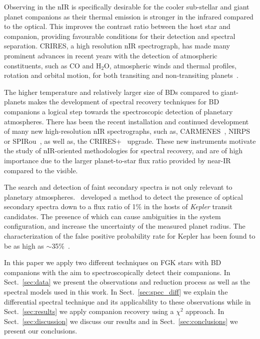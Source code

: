 Observing in the nIR is specifically desirable for the cooler sub-stellar and giant planet companions as their thermal emission is stronger in the infrared compared to the optical. This improves the contrast ratio between the host star and companion, providing favourable conditions for their detection and spectral separation. CRIRES, a high resolution nIR spectrograph, has made many prominent advances in recent years with the detection of atmospheric constituents, such as \(\textrm{CO} \) and \(\textrm{H}_{2}\textrm{O} \), atmospheric winds and thermal profiles, rotation and orbital motion, for both transiting and non-transiting planets~\citep[e.g.][]{snellen_orbital_2010, brogi_signature_2012, rodler_weighing_2012, dekok_detection_2013, brogi_carbon_2014, snellen_fast_2014, piskorz_evidence_2016, brogi_rotation_2016, birkby_discovery_2017}.

The higher temperature and relatively larger size of BDs compared to giant-planets makes the development of spectral recovery techniques for BD companions a logical step towards the spectroscopic detection of planetary atmospheres. There has been the recent installation and continued development of many new high-resolution nIR spectrographs, such as, {CARMENES}~\citep{quirrenbach_carmenes_2014}, NIRPS~\citep{bouchy_nearinfrared_2017} or SPIRou~\citep{artigau_spirou_2014}, as well as, the CRIRES+~\citep{dorn_crires_2016} upgrade. These new instruments motivate the study of nIR-oriented methodologies for spectral recovery, and are of high importance due to the larger planet-to-star flux ratio provided by near-IR compared to the visible.

{\rd{} The search and detection of faint secondary spectra is not only relevant to planetary atmospheres.~\citet{kolbl_detection_2015} developed a method to detect the presence of optical secondary spectra down to a flux ratio of 1\% in the hosts of \emph{Kepler} transit candidates. The presence of which can cause ambiguities in the system configuration, and increase the uncertainty of the measured planet radius. The characterization of the false positive probability rate for Kepler has been found to be as high as  \(\sim\)35\%~\citet{santerne_sophie_2012}.}

In this paper we apply two different techniques on FGK stars with BD companions with the aim to spectroscopically detect their companions. In Sect.~\ref{sec:data} we present the observations and reduction process as well as the spectral models used in this work. In Sect.~\ref{sec:spec_diff} we explain the differential spectral technique and its applicability to these observations while in Sect.~\ref{sec:results} we apply companion recovery using a \(\chi^{2} \) approach. In Sect.~\ref{sec:discussion} we discuss our results and in Sect.~\ref{sec:conclusions} we present our conclusions.
